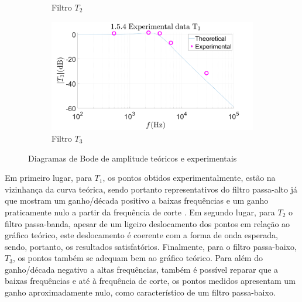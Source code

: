 \begin{figure}[ht]
\begin{subfigure}[b]{0.45\textwidth}
         \caption{Filtro $T_2$}
         \label{fig:bode_exp_KNH_comentar_T2}
     \end{subfigure}
     \begin{subfigure}[b]{0.45\textwidth}
         \centering
         \includegraphics[width=\textwidth]{Imagens/1_5_4_bodeExperimental3.png}
         \caption{Filtro $T_3$}
         \label{fig:bode_exp_KNH_comentar_T3}
     \end{subfigure}
    \hfill
    \caption{Diagramas de Bode de amplitude teóricos e experimentais}
    \label{fig:bode_exp_KNH_comentar}
\end{figure}
\par

Em primeiro lugar, para $T_1$, os pontos obtidos experimentalmente, estão na vizinhança da curva teórica, sendo portanto representativos do filtro passa-alto já que mostram um ganho/década positivo a baixas frequências e um ganho praticamente nulo a partir da frequência de corte . Em segundo lugar, para $T_2$ o filtro passa-banda, apesar de um ligeiro deslocamento dos pontos em relação ao gráfico teórico, este deslocamento é coerente com a forma de onda esperada, sendo, portanto, os resultados satisfatórios. Finalmente, para o filtro passa-baixo, $T_3$, os pontos também se adequam bem ao gráfico teórico. Para além do ganho/década negativo a altas frequências, também é possível reparar que a baixas frequências e até à frequência de corte, os pontos medidos apresentam um ganho aproximadamente nulo, como característico de um filtro passa-baixo. 

